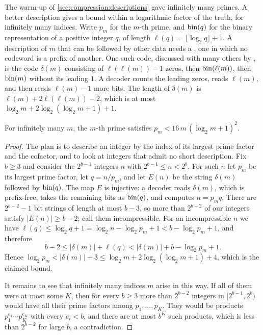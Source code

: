 \begin{refsection}
The warm-up of \cref{sec:compression:descriptions} gave infinitely many primes. A better description gives a bound within a logarithmic factor of the truth, for infinitely many indices. Write $p_m$ for the $m$-th prime, and $\operatorname{bin}(q)$ for the binary representation of a positive integer $q$, of length $\ell(q)=\lfloor\log_2q\rfloor+1$. A description of $m$ that can be followed by other data needs a , one in which no codeword is a prefix of another. One such code, discussed with many others by \textcite{LiVitanyi2008}, is the code $\delta(m)$ consisting of $\ell(\ell(m))-1$ zeros, then $\operatorname{bin}(\ell(m))$, then $\operatorname{bin}(m)$ without its leading $1$. A decoder counts the leading zeros, reads $\ell(m)$, and then reads $\ell(m)-1$ more bits. The length of $\delta(m)$ is $\ell(m)+2\ell(\ell(m))-2$, which is at most $\log_2m+2\log_2(\log_2m+1)+1$.

\begin{proposition}\label{prop:compression:primes}
For infinitely many $m$, the $m$-th prime satisfies $p_m<16\,m\,(\log_2m+1)^2$.
\end{proposition}

\begin{proof}
The plan is to describe an integer by the index of its largest prime factor and the cofactor, and to look at integers that admit no short description. Fix $b\ge3$ and consider the $2^{b-1}$ integers $n$ with $2^{b-1}\le n<2^b$. For such $n$ let $p_m$ be its largest prime factor, let $q=n/p_m$, and let $E(n)$ be the string $\delta(m)$ followed by $\operatorname{bin}(q)$. The map $E$ is injective: a decoder reads $\delta(m)$, which is prefix-free, takes the remaining bits as $\operatorname{bin}(q)$, and computes $n=p_mq$. There are $2^{b-2}-1$ bit strings of length at most $b-3$, so more than $2^{b-2}$ of our integers satisfy $|E(n)|\ge b-2$; call them incompressible. For an incompressible $n$ we have $\ell(q)\le\log_2q+1=\log_2n-\log_2p_m+1<b-\log_2p_m+1$, and therefore
\[
b-2\le|\delta(m)|+\ell(q)<|\delta(m)|+b-\log_2p_m+1.
\]
Hence $\log_2p_m<|\delta(m)|+3\le\log_2m+2\log_2(\log_2m+1)+4$, which is the claimed bound.

It remains to see that infinitely many indices $m$ arise in this way. If all of them were at most some $K$, then for every $b\ge3$ more than $2^{b-2}$ integers in $[2^{b-1},2^b)$ would have all their prime factors among $p_1,\dots,p_K$. They would be products $p_1^{e_1}\cdots p_K^{e_K}$ with every $e_i<b$, and there are at most $b^K$ such products, which is less than $2^{b-2}$ for large $b$, a contradiction.
\end{proof}


\end{refsection}
